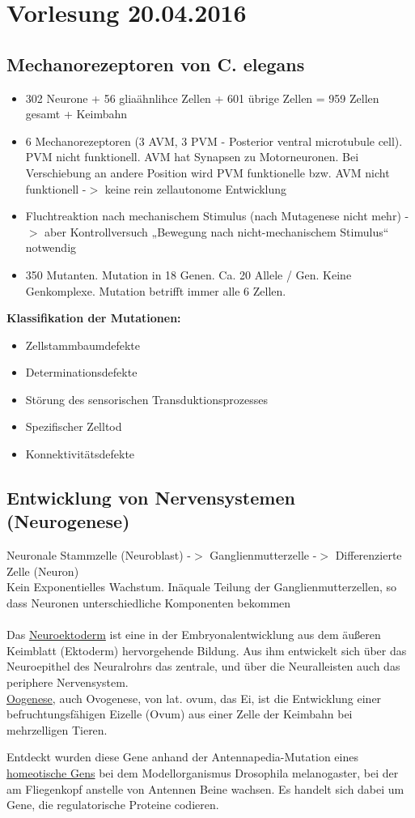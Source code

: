 \section{Vorlesung 20.04.2016}

\subsection{Mechanorezeptoren von C. elegans}
\begin{itemize}
	\item 302 Neurone + 56 gliaähnlihce Zellen + 601 übrige Zellen = 959 Zellen gesamt + Keimbahn
	\item 6 Mechanorezeptoren (3 AVM, 3 PVM - Posterior ventral microtubule cell). PVM nicht funktionell. AVM hat Synapsen zu Motorneuronen. Bei Verschiebung an andere Position wird PVM funktionelle bzw. AVM nicht funktionell -$>$ keine rein zellautonome Entwicklung
	\item Fluchtreaktion nach mechanischem Stimulus (nach Mutagenese nicht mehr) -$>$ aber Kontrollversuch „Bewegung nach nicht-mechanischem Stimulus“ notwendig
	\item 350 Mutanten. Mutation in 18 Genen. Ca. 20 Allele / Gen. Keine Genkomplexe. Mutation betrifft immer alle 6 Zellen.
\end{itemize}

\textbf{Klassifikation der Mutationen:}
\begin{itemize}
	\item Zellstammbaumdefekte
	\item Determinationsdefekte
	\item Störung des sensorischen Transduktionsprozesses
	\item Spezifischer Zelltod
	\item Konnektivitätsdefekte
\end{itemize}

\subsection{Entwicklung von Nervensystemen (Neurogenese)}
Neuronale Stammzelle (Neuroblast) -$>$ Ganglienmutterzelle -$>$ Differenzierte Zelle (Neuron)\\
Kein Exponentielles Wachstum. Inäquale Teilung der Ganglienmutterzellen, so dass Neuronen unterschiedliche Komponenten bekommen\\
\\
Das \underline{Neuroektoderm} ist eine in der Embryonalentwicklung aus dem äußeren Keimblatt (Ektoderm) hervorgehende Bildung. Aus ihm entwickelt sich über das Neuroepithel des Neuralrohrs das zentrale, und über die Neuralleisten auch das periphere Nervensystem.\\

\underline{Oogenese}, auch Ovogenese, von lat. ovum, das Ei, ist die Entwicklung einer befruchtungsfähigen Eizelle (Ovum) aus einer Zelle der Keimbahn bei mehrzelligen Tieren.

Entdeckt wurden diese Gene anhand der Antennapedia-Mutation eines \underline{homeotische Gens} bei dem Modellorganismus Drosophila melanogaster, bei der am Fliegenkopf anstelle von Antennen Beine wachsen. Es handelt sich dabei um Gene, die regulatorische Proteine codieren.